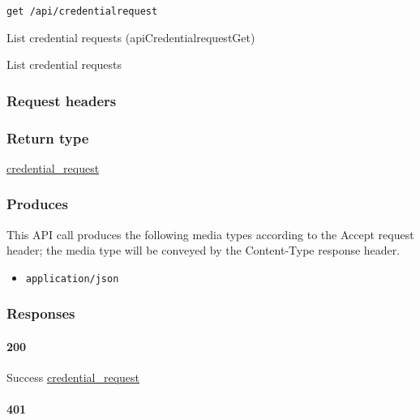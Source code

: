 \protect\hypertarget{apiCredentialrequestGet}{}{}

\begin{verbatim}
get /api/credentialrequest
\end{verbatim}

List credential requests ({apiCredentialrequestGet})

List credential requests

\hypertarget{request-headers-19}{%
\subsubsection{Request headers}\label{request-headers-19}}

\hypertarget{return-type-31}{%
\subsubsection{Return type}\label{return-type-31}}

\protect\hyperlink{credential_request}{credential\_request}

\hypertarget{produces-39}{%
\subsubsection{Produces}\label{produces-39}}

This API call produces the following media types according to the
{Accept} request header; the media type will be conveyed by the
{Content-Type} response header.

\begin{itemize}
\tightlist
\item
  \texttt{application/json}
\end{itemize}

\hypertarget{responses-39}{%
\subsubsection{Responses}\label{responses-39}}

\hypertarget{section-131}{%
\paragraph{200}\label{section-131}}

Success \protect\hyperlink{credential_request}{credential\_request}

\hypertarget{section-132}{%
\paragraph{401}\label{section-132}}

